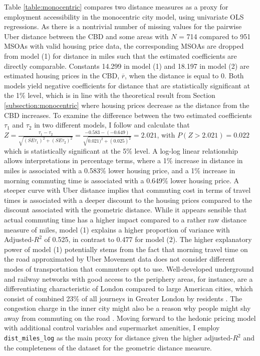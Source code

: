 \documentclass{article}
\begin{document}
Table \ref{table:monocentric} compares two distance measures as a proxy for employment accessibility in the monocentric city model, using univariate OLS regressions. As there is a nontrivial number of missing values for the pairwise Uber distance between the CBD and some areas with $N$ = 714 compared to 951 MSOAs with valid housing price data, the corresponding MSOAs are dropped from model (1) for distance in miles such that the estimated coefficients are directly comparable. Constants 14.299 in model (1) and 18.197 in model (2) are estimated housing prices in the CBD, $\overline{r}$, when the distance is equal to 0. Both models yield negative coefficients for distance that are statistically significant at the 1\% level, which is in line with the theoretical result from Section \ref{subsection:monocentric} where housing prices decrease as the distance from the CBD increases. To examine the difference between the two estimated coefficients $\tau_1$ and $\tau_2$ in two different models, I follow \citet{Clogg1995StatisticalModels.} and calculate that $Z = \frac{\tau_1 - \tau_2}{\sqrt{(SE\tau_1)^2 + (SE\tau_2)^2}}  = \frac{-0.583 - (-0.649)}{\sqrt{0.021)^2 + (0.025)^2}} = 2.021$, with $P(Z > 2.021) = 0.022$  which is statistically significant at the 5\% level. A log-log linear relationship allows interpretations in percentage terms, where a 1\% increase in distance in miles is associated with a 0.583\% lower housing price, and a 1\% increase in morning commuting time is associated with a 0.649\% lower housing price.  A steeper curve with Uber distance implies that commuting cost in terms of travel times is associated with a deeper discount to the housing prices compared to the discount associated with the geometric distance. While it appears sensible that actual commuting time has a higher impact compared to a rather raw distance measure of miles, model (1) explains a higher proportion of variance with Adjusted-$R^2$ of 0.525, in contrast to 0.477 for model (2). The higher explanatory power of model (1) potentially stems from the fact that morning travel time on the road approximated by Uber Movement data does not consider different modes of transportation that commuters opt to use. Well-developed underground and railway networks with good access to the periphery areas, for instance, are a differentiating characteristic of London compared to large American cities, which consist of combined 23\% of all journeys in Greater London by residents \citep{TransportforLondon2016TravelLondon}. The congestion charge in the inner city might also be a reason why people might shy away from commuting on the road \citep{TransportforLondon2019CongestionCharge}. Moving forward to the hedonic pricing model with additional control variables and supermarket amenities, I employ \texttt{dist\_miles\_log} as the main proxy for distance given the higher adjusted-$R^2$ and the completeness of the dataset for the geometric distance measure.
\end{document}
